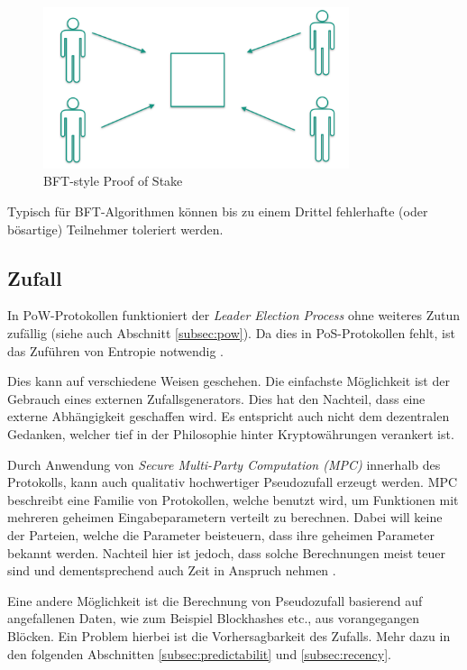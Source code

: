 \begin{figure}[htb] 
	\centerline{\includegraphics*[width=0.8\textwidth]{img/bft_pos}}
\caption{BFT-style Proof of Stake} 
\label{fig:bft_pos}
\end{figure}

Typisch für BFT-Algorithmen können bis zu einem Drittel fehlerhafte (oder bösartige) Teilnehmer toleriert werden.

\subsection{Zufall}

In PoW-Protokollen funktioniert der \textit{Leader Election Process} ohne weiteres Zutun zufällig (siehe auch Abschnitt \ref{subsec:pow}).
Da dies in PoS-Protokollen fehlt, ist das Zuführen von Entropie notwendig \cite[S. 1f.]{ouroboros}.

Dies kann auf verschiedene Weisen geschehen. Die einfachste Möglichkeit ist der Gebrauch eines externen Zufallsgenerators. Dies hat den Nachteil, dass eine externe Abhängigkeit geschaffen wird. Es entspricht auch nicht dem dezentralen Gedanken, welcher tief in der Philosophie hinter Kryptowährungen verankert ist.

Durch Anwendung von \textit{Secure Multi-Party Computation (MPC)} innerhalb des Protokolls, kann auch qualitativ hochwertiger Pseudozufall erzeugt werden.
MPC beschreibt eine Familie von Protokollen, welche benutzt wird, um Funktionen mit mehreren geheimen Eingabeparametern verteilt zu berechnen. Dabei will keine der Parteien, welche die Parameter beisteuern, dass ihre geheimen Parameter bekannt werden. Nachteil hier ist jedoch, dass solche Berechnungen meist teuer sind und dementsprechend auch Zeit in Anspruch nehmen \cite[S. 1]{mpc} \cite[S. 3]{ouroboros}.

Eine andere Möglichkeit ist die Berechnung von Pseudozufall basierend auf angefallenen Daten, wie zum Beispiel Blockhashes etc., aus vorangegangen Blöcken. Ein Problem hierbei ist die Vorhersagbarkeit des Zufalls. 
Mehr dazu in den folgenden Abschnitten \ref{subsec:predictabilit} und \ref{subsec:recency}.
